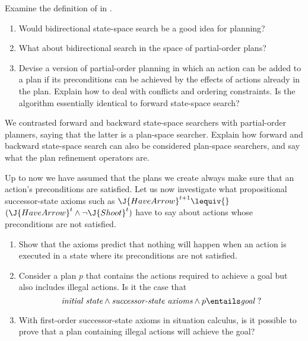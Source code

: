 \begin{uexercise}
Examine the definition of  in .
\begin{enumerate}
\item Would bidirectional state-space search be a good idea for planning? 
\item What about bidirectional search in the space of partial-order plans?
\item Devise a version of partial-order planning in which
an action can be added to a plan if its preconditions
can be achieved by the effects of actions already in the plan.
Explain how to deal with conflicts and ordering constraints.
Is the algorithm essentially identical to forward state-space search?
\end{enumerate}
\end{uexercise} 

\begin{exercise}
We contrasted forward and backward state-space searchers with
partial-order planners, saying that the latter is a plan-space searcher.  
Explain how forward and backward state-space search can also be considered  
plan-space searchers, and say what the plan refinement operators are.
\end{exercise} 

\begin{exercise}
Up to now we have assumed that the plans we create always make sure that an action's preconditions are satisfied.
Let us now investigate what propositional successor-state
axioms such as \(\J{HaveArrow}^{t+1} \lequiv {}\) \((\J{HaveArrow}^t
\land \lnot \J{Shoot}^t)\) have to say about actions whose
preconditions are not satisfied.
\begin{enumerate}
\item Show that the axioms predict that nothing will happen when an
action is executed in a state where its preconditions are not satisfied.
\item Consider a plan \(p\) that contains the actions required to achieve a goal but also 
includes illegal actions. Is it the case that
\[
\mbox{{\em initial state}}\land \mbox{{\em successor-state axioms}} \land
p \entails \mbox{{\em goal}\ ?}
\]
\item With first-order successor-state axioms in situation calculus, is it possible to 
prove that a plan containing illegal actions will achieve the goal?
\end{enumerate}
\end{exercise} 

